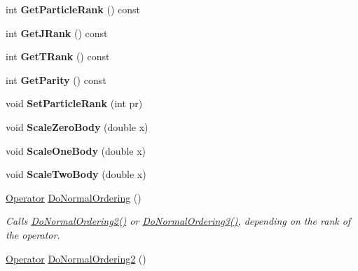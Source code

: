 \begin{DoxyCompactItemize}
\item 
\hypertarget{classOperator_a16a917d45b7d8c03868b6cd80b9efe7f}{int {\bfseries Get\-Particle\-Rank} () const }\label{classOperator_a16a917d45b7d8c03868b6cd80b9efe7f}

\item 
\hypertarget{classOperator_a5f12467caae7d72bad32ea5b7c378899}{int {\bfseries Get\-J\-Rank} () const }\label{classOperator_a5f12467caae7d72bad32ea5b7c378899}

\item 
\hypertarget{classOperator_af01419ad8d7a4097f5520ae6d533e93f}{int {\bfseries Get\-T\-Rank} () const }\label{classOperator_af01419ad8d7a4097f5520ae6d533e93f}

\item 
\hypertarget{classOperator_a7b3d8e2ca9f0ba631b59220cf04dbe39}{int {\bfseries Get\-Parity} () const }\label{classOperator_a7b3d8e2ca9f0ba631b59220cf04dbe39}

\item 
\hypertarget{classOperator_a77eb97b1309a1c4e20101217903b9771}{void {\bfseries Set\-Particle\-Rank} (int pr)}\label{classOperator_a77eb97b1309a1c4e20101217903b9771}

\item 
\hypertarget{classOperator_a3a25803bc77344396f2dd0e75d2a020d}{void {\bfseries Scale\-Zero\-Body} (double x)}\label{classOperator_a3a25803bc77344396f2dd0e75d2a020d}

\item 
\hypertarget{classOperator_a5466cc965277b75b14b60918f4d652ab}{void {\bfseries Scale\-One\-Body} (double x)}\label{classOperator_a5466cc965277b75b14b60918f4d652ab}

\item 
\hypertarget{classOperator_af1f244c4856d11c21f94b6c6cd24a555}{void {\bfseries Scale\-Two\-Body} (double x)}\label{classOperator_af1f244c4856d11c21f94b6c6cd24a555}

\item 
\hypertarget{classOperator_a622880b91a902c832b867c6447a262e7}{\hyperlink{classOperator}{Operator} \hyperlink{classOperator_a622880b91a902c832b867c6447a262e7}{Do\-Normal\-Ordering} ()}\label{classOperator_a622880b91a902c832b867c6447a262e7}

\begin{DoxyCompactList}\small\item\em Calls \hyperlink{classOperator_a652d989590422a2b26e662625b07254e}{Do\-Normal\-Ordering2()} or \hyperlink{classOperator_a7fd029569796107c87ff17c5a7912480}{Do\-Normal\-Ordering3()}, depending on the rank of the operator. \end{DoxyCompactList}\item 
\hypertarget{classOperator_a652d989590422a2b26e662625b07254e}{\hyperlink{classOperator}{Operator} \hyperlink{classOperator_a652d989590422a2b26e662625b07254e}{Do\-Normal\-Ordering2} ()}\label{classOperator_a652d989590422a2b26e662625b07254e}


\end{DoxyCompactItemize}
